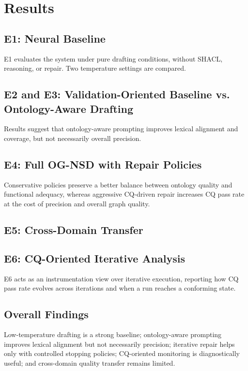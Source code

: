 \section{Results}
\subsection{E1: Neural Baseline}
E1 evaluates the system under pure drafting conditions, without SHACL, reasoning, or repair. Two temperature settings are compared.

\subsection{E2 and E3: Validation-Oriented Baseline vs. Ontology-Aware Drafting}
Results suggest that ontology-aware prompting improves lexical alignment and coverage, but not necessarily overall precision.

\subsection{E4: Full OG-NSD with Repair Policies}
Conservative policies preserve a better balance between ontology quality and functional adequacy, whereas aggressive CQ-driven repair increases CQ pass rate at the cost of precision and overall graph quality.

\subsection{E5: Cross-Domain Transfer}
\subsection{E6: CQ-Oriented Iterative Analysis}
E6 acts as an instrumentation view over iterative execution, reporting how CQ pass rate evolves across iterations and when a run reaches a conforming state.

\subsection{Overall Findings}
Low-temperature drafting is a strong baseline; ontology-aware prompting improves lexical alignment but not necessarily precision; iterative repair helps only with controlled stopping policies; CQ-oriented monitoring is diagnostically useful; and cross-domain quality transfer remains limited.
